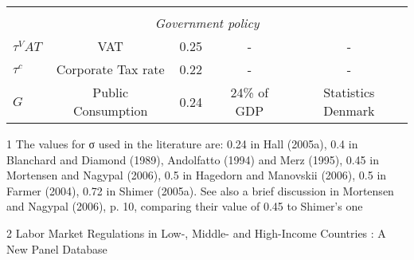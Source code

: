 \begin{table}[H]
\begin{threeparttable}
{\begin{tabular}{lcccc}
\multicolumn{5}{c}{} \\
\multicolumn{5}{c}{\textit{Government policy}} \\
$\tau^VAT$ & VAT & 0.25 &  -  &  -   \\
$\tau^c$ & Corporate Tax rate & 0.22 &  -  &  -   \\
$G$  & Public Consumption & 0.24 &  24\% of GDP  & Statistics Denmark   \\

\midrule[\heavyrulewidth]
\end{tabular}
}
\end{threeparttable}
\begin{tablenotes}[para]\footnotesize 
\item[1] The values for σ used in the literature are: 0.24 in Hall (2005a), 0.4 in Blanchard and Diamond (1989), Andolfatto
(1994) and Merz (1995), 0.45 in Mortensen and Nagypal (2006), 0.5 in Hagedorn and Manovskii (2006), 0.5 in Farmer
(2004), 0.72 in Shimer (2005a). See also a brief discussion in Mortensen and Nagypal (2006), p. 10, comparing their
value of 0.45 to Shimer’s one \\
\item[2] Labor Market Regulations in Low-, Middle- and High-Income Countries : A New Panel Database
\end{tablenotes}
\end{table}
